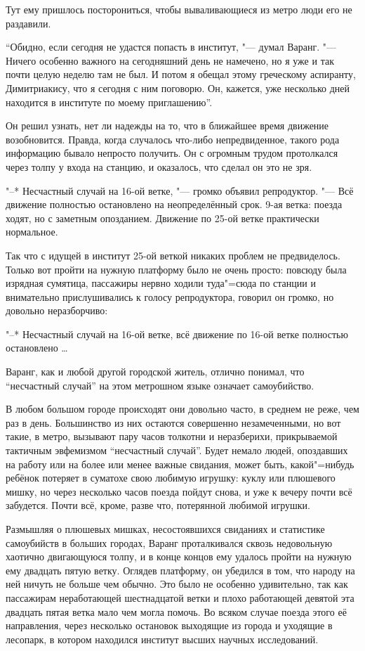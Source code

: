Тут ему пришлось посторониться, чтобы вываливающиеся из метро люди его не
раздавили.

\enquote{Обидно, если сегодня не удастся попасть в институт, "--- думал Варанг.
"--- Ничего особенно важного на сегодняшний день не намечено, но я уже и так
почти целую неделю там не был.
И потом я обещал этому греческому аспиранту, Димитриакису, что я сегодня с ним
поговорю.
Он, кажется, уже несколько дней находится в институте по моему приглашению}.

Он решил узнать, нет ли надежды на то, что в ближайшее время движение
возобновится.
Правда, когда случалось что-либо непредвиденное, такого рода информацию бывало
непросто получить.
Он с огромным трудом протолкался через толпу у входа на станцию, и оказалось,
что сделал он это не зря.

"--* Несчастный случай на 16-ой ветке, "--- громко объявил репродуктор.
"--- Всё движение полностью остановлено на неопределённый срок.
9-ая ветка: поезда ходят, но с заметным опозданием.
Движение по 25-ой ветке практически нормальное.

Так что с идущей в институт 25-ой веткой никаких проблем не предвиделось.
Только вот пройти на нужную платформу было не очень просто: повсюду была
изрядная сумятица, пассажиры нервно ходили туда"=сюда по станции и внимательно
прислушивались к голосу репродуктора, говорил он громко, но довольно
неразборчиво:

"--* Несчастный случай на 16-ой ветке, всё движение по 16-ой ветке полностью
остановлено \ldots

Варанг, как и любой другой городской житель, отлично понимал, что
\enquote{несчастный случай} на этом метрошном языке означает самоубийство.

В любом большом городе происходят они довольно часто, в среднем не реже, чем раз
в день.
Большинство из них остаются совершенно незамеченными, но вот такие, в метро,
вызывают пару часов толкотни и неразберихи, прикрываемой тактичным эвфемизмом
\enquote{несчастный случай}.
Будет немало людей, опоздавших на работу или на более или менее важные свидания,
может быть, какой"=нибудь ребёнок потеряет в суматохе свою любимую игрушку:
куклу или плюшевого мишку, но через несколько часов поезда пойдут снова, и уже к
вечеру почти всё забудется.
Почти всё, кроме, разве что, потерянной любимой игрушки.

Размышляя о плюшевых мишках, несостоявшихся свиданиях и статистике самоубийств в
больших городах, Варанг проталкивался сквозь недовольную хаотично двигающуюся
толпу, и в конце концов ему удалось пройти на нужную ему двадцать пятую ветку.
Оглядев платформу, он убедился в том, что народу на ней ничуть не больше чем
обычно.
Это было не особенно удивительно, так как пассажирам неработающей шестнадцатой
ветки и плохо работающей девятой эта двадцать пятая ветка мало чем могла помочь.
Во всяком случае поезда этого её направления, через несколько остановок
выходящие из города и уходящие в лесопарк, в котором находился институт высших
научных исследований.

